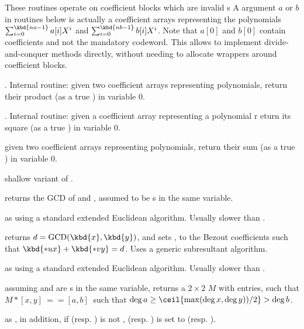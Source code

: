 
These routines operate on coefficient blocks which are invalid s
A  argument $a$ or $b$ in routines below is actually a coefficient
arrays representing the polynomials
 $\sum_{i = 0}^{\kbd{na-1}} a[i] X^i$ and
 $\sum_{i = 0}^{\kbd{nb-1}} b[i] X^i$. Note that $a[0]$ and $b[0]$ contain
coefficients and not the mandatory  codeword. This allows to implement
divide-and-conquer methods directly, without needing to allocate wrappers
around coefficient blocks.

. Internal routine:
given two coefficient arrays representing polynomials, return their product (as
a true ) in variable $0$.

. Internal routine:
given a coefficient array representing a polynomial r eturn its square (as a
true ) in variable $0$.

given two coefficient arrays representing polynomials, return their sum (as a
true ) in variable $0$.

 shallow
variant of .


 returns the GCD of  and ,
assumed to be s in the same variable.

 as  using a standard
extended Euclidean algorithm. Usually slower than .

 returns
$d = \text{GCD}(\kbd{x},\kbd{y})$, and sets ,  to the Bezout
coefficients such that $\kbd{*ux} + \kbd{*vy} = d$. Uses a generic
subresultant algorithm.

 as
 using a standard extended Euclidean algorithm. Usually
slower than .

assuming  and  are s in the same variable,
returns a $2\times 2$  $M$ with  entries,
such that $M*[x,y]~==[a,b]~$ such that
$\deg a \geq \ceil{\max(\deg x,\deg y))/2} > \deg b$.

as , in addition, if  (resp. ) is not
,  (resp. )
is set to  (resp. ).

